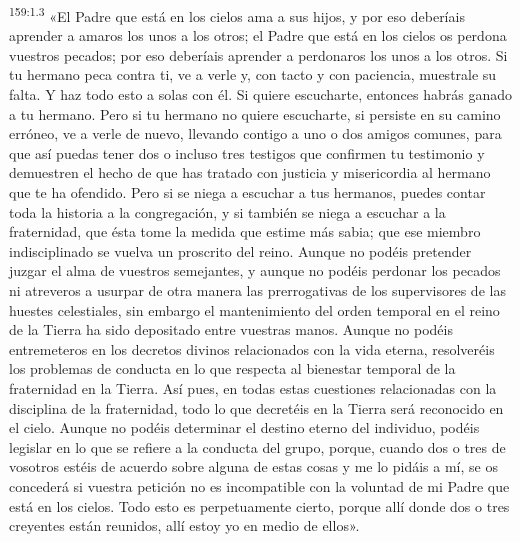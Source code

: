 \par 
\textsuperscript{159:1.3} «El Padre que está en los cielos ama a sus hijos, y por eso deberíais aprender a amaros los unos a los otros; el Padre que está en los cielos os perdona vuestros pecados; por eso deberíais aprender a perdonaros los unos a los otros. Si tu hermano peca contra ti, ve a verle y, con tacto y con paciencia, muestrale su falta. Y haz todo esto a solas con él. Si quiere escucharte, entonces habrás ganado a tu hermano. Pero si tu hermano no quiere escucharte, si persiste en su camino erróneo, ve a verle de nuevo, llevando contigo a uno o dos amigos comunes, para que así puedas tener dos o incluso tres testigos que confirmen tu testimonio y demuestren el hecho de que has tratado con justicia y misericordia al hermano que te ha ofendido. Pero si se niega a escuchar a tus hermanos, puedes contar toda la historia a la congregación, y si también se niega a escuchar a la fraternidad, que ésta tome la medida que estime más sabia; que ese miembro indisciplinado se vuelva un proscrito del reino. Aunque no podéis pretender juzgar el alma de vuestros semejantes, y aunque no podéis perdonar los pecados ni atreveros a usurpar de otra manera las prerrogativas de los supervisores de las huestes celestiales, sin embargo el mantenimiento del orden temporal en el reino de la Tierra ha sido depositado entre vuestras manos. Aunque no podéis entremeteros en los decretos divinos relacionados con la vida eterna, resolveréis los problemas de conducta en lo que respecta al bienestar temporal de la fraternidad en la Tierra. Así pues, en todas estas cuestiones relacionadas con la disciplina de la fraternidad, todo lo que decretéis en la Tierra será reconocido en el cielo. Aunque no podéis determinar el destino eterno del individuo, podéis legislar en lo que se refiere a la conducta del grupo, porque, cuando dos o tres de vosotros estéis de acuerdo sobre alguna de estas cosas y me lo pidáis a mí, se os concederá si vuestra petición no es incompatible con la voluntad de mi Padre que está en los cielos. Todo esto es perpetuamente cierto, porque allí donde dos o tres creyentes están reunidos, allí estoy yo en medio de ellos».

